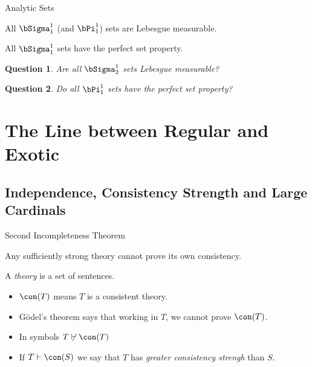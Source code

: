 \documentclass{beamer}
\newtheorem*{question}{Question}
\begin{document}
\begin{frame}{Analytic Sets}

\begin{theorem}[Luzin, 1917]
All $\bSigma^1_1$ (and $\bPi^1_1$) sets are Lebesgue measurable.
\end{theorem}

\begin{theorem}[Suslin, 197]
All $\bSigma^1_1$  sets have the perfect set property.
\end{theorem}

\begin{question}
Are all $\bSigma^1_2$ sets Lebesgue measurable?
\end{question}

\begin{question}
Do all $\bPi^1_1$ sets have the perfect set property?
\end{question}

\end{frame}

\section{The Line between Regular and Exotic}

\subsection{Independence, Consistency Strength and Large Cardinals}

\begin{frame}{Second Incompleteness Theorem}
\begin{theorem}
Any sufficiently strong theory cannot prove its own consistency.
\end{theorem}

\begin{definition}
A \emph{theory} is a set of sentences.
\end{definition}

\begin{itemize}
\item $\con(T)$ means $T$ is a consistent theory.
\item G\"{o}del's theorem says that working in $T$, we cannot prove $\con(T)$.
\item In symbols $T\not\vdash\con(T)$
\item If $T\vdash\con(S)$ we say that $T$ has
\emph{greater consistency strengh} than $S$.
\end{itemize}

\end{frame}
\end{document}
